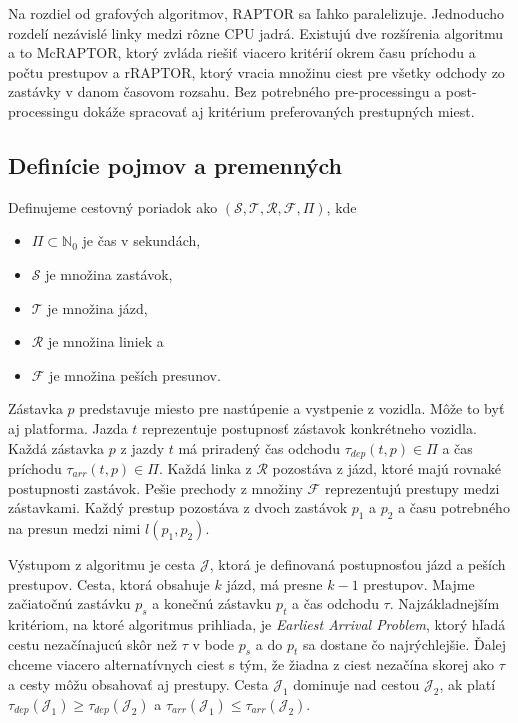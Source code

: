 Na rozdiel od grafových algoritmov, RAPTOR sa ľahko paralelizuje. Jednoducho rozdelí nezávislé linky medzi rôzne CPU jadrá. Existujú dve rozšírenia algoritmu a to McRAPTOR, ktorý zvláda riešiť viacero kritérií okrem času príchodu a počtu prestupov a rRAPTOR, ktorý vracia množinu ciest pre všetky odchody zo zastávky v danom časovom rozsahu. Bez potrebného pre-processingu a post-processingu dokáže spracovať aj kritérium preferovaných prestupných miest.

\subsection{Definície pojmov a premenných}

Definujeme cestovný poriadok ako $(\mathcal{S,T,R,F},\Pi)$, kde 
\begin{itemize}
\item $\Pi \subset \mathbb{N}_{0}$ je čas v sekundách, 
\item $\mathcal{S}$ je množina zastávok,
\item $\mathcal{T}$ je množina jázd, 
\item $\mathcal{R}$ je množina liniek a 
\item $\mathcal{F}$ je množina peších presunov.
\end{itemize}

Zástavka $p$ predstavuje miesto pre nastúpenie a vystpenie z vozidla. Môže to byť aj platforma. Jazda $t$ reprezentuje postupnosť zástavok konkrétneho vozidla. Každá zástavka $p$ z jazdy $t$ má priradený čas odchodu $\tau_{dep}(t, p) \in \Pi$ a čas príchodu $\tau_{arr}(t, p) \in \Pi$. Každá linka z $\mathcal{R}$ pozostáva z jázd, ktoré majú rovnaké postupnosti zastávok. Pešie prechody z množiny $\mathcal{F}$ reprezentujú prestupy medzi zástavkami. Každý prestup pozostáva z dvoch zastávok $p_1$ a $p_2$ a času potrebného na presun medzi nimi $l(p_1, p_2)$. 

Výstupom z algoritmu je cesta $\mathcal{J}$, ktorá je definovaná postupnosťou jázd a peších prestupov. Cesta, ktorá obsahuje $k$ jázd, má presne $k-1$ prestupov. Majme začiatočnú zastávku $p_s$ a konečnú zástavku $p_t$ a čas odchodu $\tau$. Najzákladnejším kritériom, na ktoré algoritmus prihliada, je \textit{Earliest Arrival Problem}, ktorý hľadá cestu nezačínajucú skôr než $\tau$ v bode $p_s$ a do $p_t$ sa dostane čo najrýchlejšie. Ďalej chceme viacero alternatívnych ciest s tým, že žiadna z ciest nezačína skorej ako $\tau$ a cesty môžu obsahovať aj prestupy. Cesta $\mathcal{J}_1$ dominuje nad cestou $\mathcal{J}_2$, ak platí
$\tau_{dep}(\mathcal{J}_1) \geq \tau_{dep}(\mathcal{J}_2)$ a $\tau_{arr}(\mathcal{J}_1) \leq \tau_{arr}(\mathcal{J}_2)$. 

